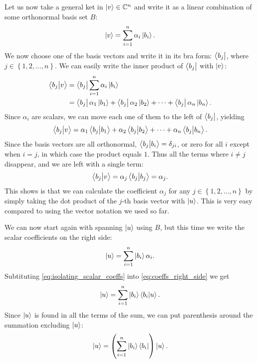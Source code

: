 Let us now take a general ket in $\ket{v}\in\mathbb{C}^{n}$ and write it as a linear combination of some orthonormal basis set $B$:
\begin{equation}
	\ket{v} = \sum\limits_{i=1}^{n}\alpha_{i}\ket{b_{i}}.
	\label{eq:}
\end{equation}
We now choose one of the basis vectors and write it in its bra form: $\bra{b_{j}}$, where $j\in\left\{1,2,\dots,n\right\}$. We can easily write the inner product of $\bra{b_{j}}$ with $\ket{v}$:
\begin{align}
	\innerproduct{b_{j}}{v} &= \bra{b_{j}}\sum\limits_{i=1}^{n}\alpha_{i}\ket{b_{i}}\nonumber\\
	&= \bra{b_{j}}\alpha_{1}\ket{b_{1}} + \bra{b_{j}}\alpha_{2}\ket{b_{2}} + \dots + \bra{b_{j}}\alpha_{n}\ket{b_{n}}.
	\label{eq:}
\end{align}
Since $\alpha_{i}$ are scalars, we can move each one of them to the left of $\bra{b_{j}}$, yielding
\begin{equation}
	\innerproduct{b_{j}}{v} = \alpha_{1}\innerproduct{b_{j}}{b_{1}} + \alpha_{2}\innerproduct{b_{j}}{b_{2}} + \cdots + \alpha_{n}\innerproduct{b_{j}}{b_{n}}.
	\label{eq:}
\end{equation}
Since the basis vectors are all orthonormal, $\innerproduct{b_{j}}{b_{i}}=\delta_{ji}$, or zero for all $i$ except when $i=j$, in which case the product equals $1$. Thus all the terms where $i\neq j$ disappear, and we are left with a single term:
\begin{align}
	\innerproduct{b_{j}}{v} = \alpha_{j}\innerproduct{b_{j}} = \alpha_{j}.
	\label{eq:isolating_scalar_coeffs}
\end{align}
This shows is that we can calculate the coefficient $\alpha_{j}$ for any $j\in\left\{1,2,\dots,n\right\}$ by simply taking the dot product of the $j$-th basis vector with $\ket{u}$. This is very easy compared to using the vector notation we used so far.

We can now start again with spanning $\ket{u}$ using $B$, but this time we write the scalar coefficients on the right side:
\begin{equation}
	\ket{u} = \sum\limits_{i=1}^{n}\ket{b_{i}}\alpha_{i}.
	\label{eq:coeffs_right_side}
\end{equation}
Subtituting \autoref{eq:isolating_scalar_coeffs} into \autoref{eq:coeffs_right_side} we get
\begin{equation}
	\ket{u} = \sum\limits_{i=1}^{n}\ket{b_{i}}\innerproduct{b_{i}}{u}.
	\label{eq:ket_as_sum_of_outer_products}
\end{equation}
Since $\ket{u}$ is found in all the terms of the sum, we can put parenthesis around the summation excluding $\ket{u}$:
\begin{equation}
	\ket{u} = \left(\sum\limits_{i=1}^{n}\ket{b_{i}}\bra{b_{i}}\right)\ket{u}.
	\label{eq:ket_as_sum_of_outer_products_parenthesis}
\end{equation}

